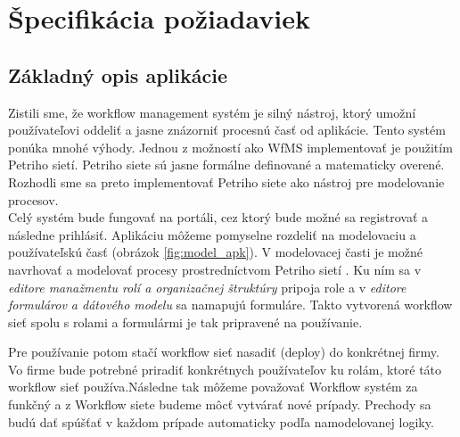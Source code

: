 


\section{Špecifikácia požiadaviek}

\subsection{Základný opis aplikácie}
Zistili sme, že workflow management systém je silný nástroj, ktorý umožní používateľovi oddeliť a jasne znázorniť procesnú časť od aplikácie. Tento systém ponúka mnohé výhody. Jednou z možností ako WfMS implementovať je použitím Petriho sietí. Petriho siete sú jasne formálne definované a matematicky overené.  Rozhodli sme sa preto implementovať Petriho siete ako nástroj pre modelovanie procesov.\\

Celý systém bude fungovať na portáli, cez ktorý bude možné sa registrovať a následne prihlásiť. Aplikáciu môžeme pomyselne rozdeliť na modelovaciu a používateľskú časť (obrázok \ref{fig:model_apk}). V modelovacej časti je možné navrhovať a modelovať procesy prostredníctvom Petriho sietí . Ku ním sa v \emph{editore manažmentu rolí a organizačnej štruktúry} pripoja role a v \emph{editore formulárov a dátového modelu} sa namapujú formuláre. Takto vytvorená workflow sieť spolu s rolami a formulármi je tak pripravené na používanie. 

Pre používanie potom stačí workflow sieť nasadiť (deploy) do konkrétnej firmy. Vo firme bude potrebné priradiť konkrétnych používateľov ku rolám, ktoré táto workflow sieť používa.Následne tak môžeme považovať Workflow systém za funkčný a z Workflow siete budeme môcť vytvárať nové prípady. Prechody sa budú dať spúšťať v každom prípade  automaticky podľa namodelovanej logiky.

